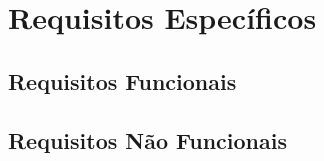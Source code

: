 \chapter{Requisitos Específicos}


\section{Requisitos Funcionais}


\section{Requisitos Não Funcionais}